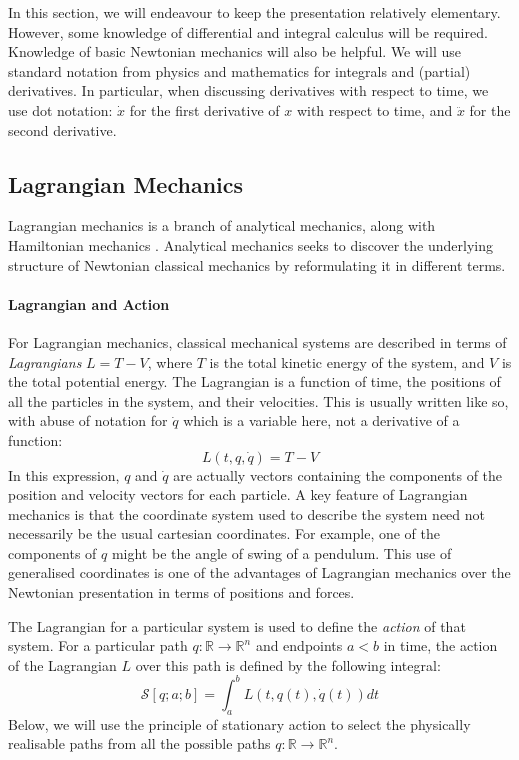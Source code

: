 \documentclass[preprint]{sigplanconf}
\theoremstyle{examplestyle}
\begin{document}
In this section, we will endeavour to keep the presentation relatively
elementary. However, some knowledge of differential and integral
calculus will be required. Knowledge of basic Newtonian mechanics will
also be helpful. We will use standard notation from physics and
mathematics for integrals and (partial) derivatives. In particular,
when discussing derivatives with respect to time, we use dot notation:
$\dot{x}$ for the first derivative of $x$ with respect to time, and
$\ddot{x}$ for the second derivative.

\subsection{Lagrangian Mechanics}

Lagrangian mechanics is a branch of analytical mechanics, along with
Hamiltonian mechanics
\cite{landau60mechanics,arnold89mathematical}. Analytical mechanics
seeks to discover the underlying structure of Newtonian classical
mechanics by reformulating it in different terms.

\paragraph{Lagrangian and Action}

For Lagrangian mechanics, classical mechanical systems are described
in terms of \emph{Lagrangians} $L = T - V$, where $T$ is the total
kinetic energy of the system, and $V$ is the total potential
energy. The Lagrangian is a function of time, the positions of all the
particles in the system, and their velocities. This is usually written
like so, with abuse of notation for $\dot{q}$ which is a variable
here, not a derivative of a function:
\begin{displaymath}
  L(t, q, \dot{q}) = T - V
\end{displaymath}
In this expression, $q$ and $\dot{q}$ are actually vectors containing
the components of the position and velocity vectors for each
particle. A key feature of Lagrangian mechanics is that the coordinate
system used to describe the system need not necessarily be the usual
cartesian coordinates. For example, one of the components of $q$ might
be the angle of swing of a pendulum. This use of generalised
coordinates is one of the advantages of Lagrangian mechanics over the
Newtonian presentation in terms of positions and forces.

The Lagrangian for a particular system is used to define the
\emph{action} of that system. For a particular path $q : \mathbb{R}
\to \mathbb{R}^n$ and endpoints $a < b$ in time, the action of the
Lagrangian $L$ over this path is defined by the following integral:
\begin{displaymath}
  \mathcal{S}[q;a;b] = \int_a^b L(t,q(t),\dot{q}(t)) \mathit{dt}
\end{displaymath}
Below, we will use the principle of stationary action to select the
physically realisable paths from all the possible paths $q :
\mathbb{R} \to \mathbb{R}^n$.
\end{document}
